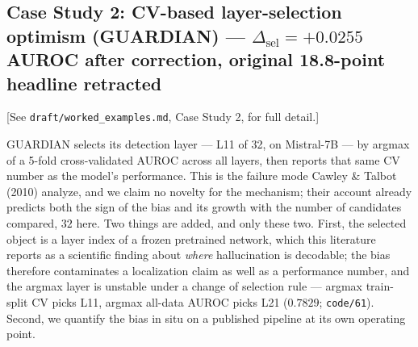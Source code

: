 \documentclass[10pt]{article} %
\begin{document}
\subsection{Case Study 2: CV-based layer-selection optimism (GUARDIAN) --- $\Delta_{\text{sel}}=+0.0255$ AUROC after correction, original 18.8-point headline retracted}

[See \texttt{draft/worked\_examples.md}, Case Study 2, for full detail.]

GUARDIAN selects its detection layer --- L11 of 32, on Mistral-7B --- by argmax
of a 5-fold cross-validated AUROC across all layers, then reports that same CV
number as the model's performance. This is the failure mode Cawley \& Talbot
(2010) analyze, and we claim no novelty for the mechanism; their account
already predicts both the sign of the bias and its growth with the number of
candidates compared, $32$ here. Two things are added, and only these two.
First, the selected object is a layer index of a frozen pretrained network,
which this literature reports as a scientific finding about \emph{where}
hallucination is decodable; the bias therefore contaminates a localization
claim as well as a performance number, and the argmax layer is unstable under a
change of selection rule --- argmax train-split CV picks L11, argmax all-data
AUROC picks L21 ($0.7829$; \texttt{code/61}). Second, we quantify the bias in
situ on a published pipeline at its own operating point.
\end{document}
